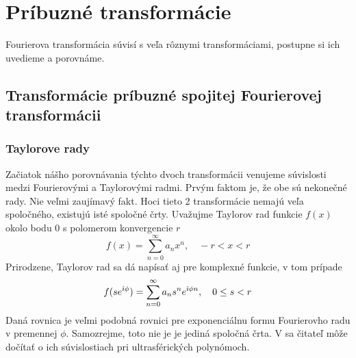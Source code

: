 \section{Príbuzné transformácie}

Fourierova transformácia súvisí s veľa rôznymi transformáciami,
postupne si ich uvedieme a porovnáme.

\subsection{Transformácie príbuzné spojitej Fourierovej transformácii}
\subsubsection{Taylorove rady}
Začiatok nášho porovnávania týchto dvoch transformácii venujeme
súvislosti medzi Fourierovými a Taylorovými radmi. Prvým faktom je, že
obe sú nekonečné rady. Nie veľmi zaujímavý fakt. Hoci tieto 2
transformácie nemajú veľa spoločného, existujú isté spoločné črty.
Uvažujme Taylorov rad funkcie $f(x)$ okolo bodu 0 s polomerom konvergencie $r$
\begin{equation}
    f(x) = \sum_{n=0}^{\infty} a_n x^n, \quad -r < x < r
\end{equation}
Prirodzene, Taylorov rad sa dá napísať aj pre komplexné funkcie, v tom
prípade
\begin{equation}
    f(s e^{\hat{\imath} \phi}) = \sum_{n=0}^{\infty} a_n s^n e^{\hat{\imath} \phi n},
        \quad  0 \le s <r
\end{equation}
Daná rovnica je veľmi podobná rovnici \todo{} pre exponenciálnu formu
Fourierovho radu v premennej $\phi$.
Samozrejme, toto nie je je jediná spoločná črta. V \cite{taylor} sa
čitateľ môže dočítať o ich súvislostiach pri ultrasférických
polynómoch.



